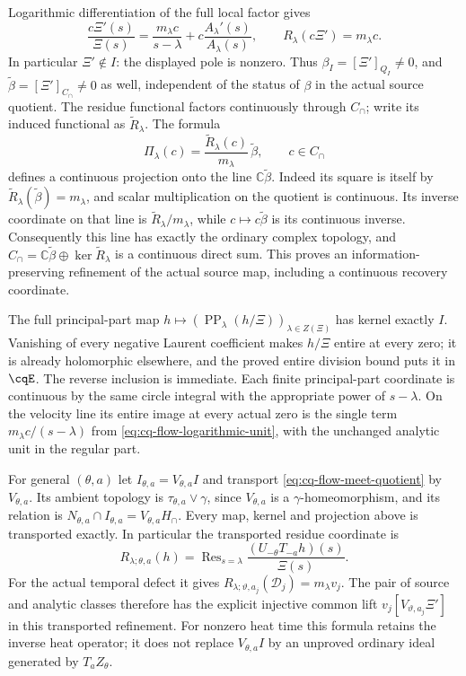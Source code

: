 Logarithmic differentiation of the full local factor gives
\begin{equation}
 \frac{c\Xi'(s)}{\Xi(s)}
 =\frac{m_\lambda c}{s-\lambda}
        +c\frac{A_\lambda'(s)}{A_\lambda(s)},\qquad
 R_\lambda(c\Xi')=m_\lambda c .
 \label{eq:cq-flow-logarithmic-unit}
\end{equation}
In particular $\Xi'\notin I$: the displayed pole is nonzero.
Thus $\beta_I=[\Xi']_{Q_I}\ne0$, and
$\widetilde\beta=[\Xi']_{C_\cap}\ne0$ as well, independent of the
status of $\beta$ in the actual source quotient.
The residue functional factors continuously through $C_\cap$; write
its induced functional as $\widetilde R_\lambda$.
The formula
\begin{equation}
 \Pi_\lambda(c)
  =\frac{\widetilde R_\lambda(c)}{m_\lambda}\,
                  \widetilde\beta,\qquad c\in C_\cap
 \label{eq:cq-flow-meet-projection}
\end{equation}
defines a continuous projection onto the line
$\mathbb C\widetilde\beta$. Indeed its square is itself by
$\widetilde R_\lambda(\widetilde\beta)=m_\lambda$, and scalar
multiplication on the quotient is continuous. Its inverse coordinate
on that line is $\widetilde R_\lambda/m_\lambda$, while
$c\mapsto c\widetilde\beta$ is its continuous inverse.
Consequently this line has exactly the ordinary complex topology,
and
$C_\cap=\mathbb C\widetilde\beta\oplus
\ker\widetilde R_\lambda$ is a continuous direct sum.
This proves an information-preserving refinement of the actual
source map, including a continuous recovery coordinate.

The full principal-part map
$h\mapsto(\operatorname{PP}_\lambda(h/\Xi))_{\lambda\in Z(\Xi)}$
has kernel exactly $I$. Vanishing of every negative Laurent
coefficient makes $h/\Xi$ entire at every zero; it is already
holomorphic elsewhere, and the proved entire division bound
puts it in $\cqE$. The reverse inclusion is immediate.
Each finite principal-part coordinate is continuous by the same
circle integral with the appropriate power of $s-\lambda$.
On the velocity line its entire image at every actual zero is
the single term $m_\lambda c/(s-\lambda)$ from
\eqref{eq:cq-flow-logarithmic-unit}, with the unchanged analytic
unit in the regular part.

For general $(\theta,a)$ let
$I_{\theta,a}=V_{\theta,a}I$ and transport
\eqref{eq:cq-flow-meet-quotient} by $V_{\theta,a}$.
Its ambient topology is
$\tau_{\theta,a}\vee\gamma$, since $V_{\theta,a}$ is a
$\gamma$-homeomorphism, and its relation is
$N_{\theta,a}\cap I_{\theta,a}=V_{\theta,a}H_\cap$.
Every map, kernel and projection above is transported exactly.
In particular the transported residue coordinate is
\[
 R_{\lambda;\theta,a}(h)
 =\operatorname{Res}_{s=\lambda}
           \frac{(U_{-\theta}T_{-a}h)(s)}{\Xi(s)}.
\]
For the actual temporal defect it gives
$R_{\lambda;\vartheta,a_j}(\mathcal D_j)=m_\lambda v_j$.
The pair of source and analytic classes therefore has the
explicit injective common lift
$v_j[V_{\vartheta,a_j}\Xi']$ in this transported refinement.
For nonzero heat time this formula retains the inverse heat
operator; it does not replace $V_{\theta,a}I$ by an unproved
ordinary ideal generated by $T_aZ_\theta$.

